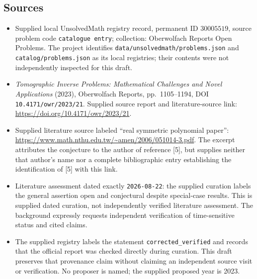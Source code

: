 \documentclass[11pt]{article}
\begin{document}
\subsection{Sources}
\begin{itemize}
\item Supplied local UnsolvedMath registry record, permanent ID \(30005519\), source problem code \texttt{catalogue entry}; collection: Oberwolfach Reports Open Problems. The project identifies \texttt{data/unsolvedmath/problems.json} and \texttt{catalog/problems.json} as its local registries; their contents were not independently inspected for this draft.
\item \emph{Tomographic Inverse Problems: Mathematical Challenges and Novel Applications} (2023), Oberwolfach Reports, pp.~1105--1194, DOI \texttt{10.4171/owr/2023/21}. Supplied source report and literature-source link: \url{https://doi.org/10.4171/owr/2023/21}.
\item Supplied literature source labeled ``real symmetric polynomial paper'': \url{https://www.math.nthu.edu.tw/~amen/2006/051014-3.pdf}. The excerpt attributes the conjecture to the author of reference [5], but supplies neither that author's name nor a complete bibliographic entry establishing the identification of [5] with this link.
\item Literature assessment dated exactly \texttt{2026-08-22}: the supplied curation labels the general assertion open and conjectural despite special-case results. This is supplied dated curation, not independently verified literature assessment. The background expressly requests independent verification of time-sensitive status and cited claims.
\item The supplied registry labels the statement \texttt{corrected\_verified} and records that the official report was checked directly during curation. This draft preserves that provenance claim without claiming an independent source visit or verification. No proposer is named; the supplied proposed year is 2023.
\end{itemize}
\end{document}
